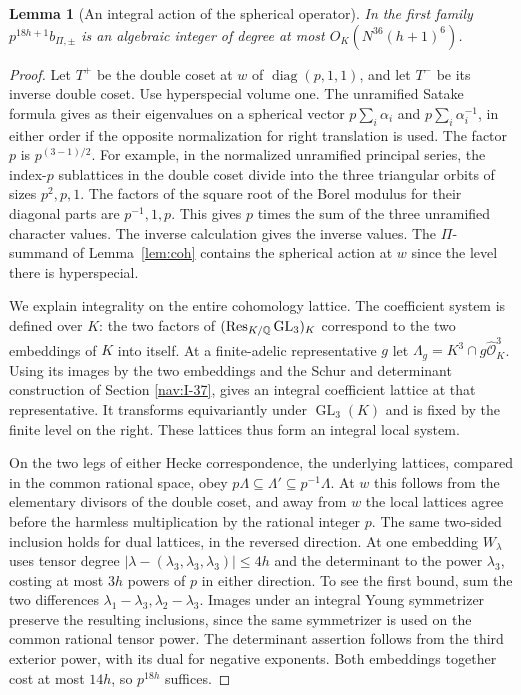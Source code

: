 \documentclass[a4paper,11pt]{article}
\newtheorem{lemma}[proposition]{Lemma}
\theoremstyle{definition}
\theoremstyle{remark}
\numberwithin{equation}{section}
\newcommand{\GL}{\operatorname{GL}}
\newcommand{\OO}{\mathcal O}
\begin{document}
\begin{lemma}[An integral action of the spherical operator]\label{lem:int}
In the first family \(p^{18h+1}b_{\Pi,\pm}\) is an algebraic integer of degree at most \(O_K(N^{36}(h+1)^6)\).
\end{lemma}
\begin{proof}
Let \(T^+\) be the double coset at \(w\) of \(\operatorname{diag}(p,1,1)\), and let \(T^-\) be its inverse double coset. Use hyperspecial volume one. The unramified Satake formula gives as their eigenvalues on a spherical vector \(p\sum_i\alpha_i\) and \(p\sum_i\alpha_i^{-1}\), in either order if the opposite normalization for right translation is used. The factor \(p\) is \(p^{(3-1)/2}\). For example, in the normalized unramified principal series, the index-\(p\) sublattices in the double coset divide into the three triangular orbits of sizes \(p^2,p,1\). The factors of the square root of the Borel modulus for their diagonal parts are \(p^{-1},1,p\). This gives \(p\) times the sum of the three unramified character values. The inverse calculation gives the inverse values. The \(\Pi\)-summand of Lemma~\ref{lem:coh} contains the spherical action at \(w\) since the level there is hyperspecial.

We explain integrality on the entire cohomology lattice. The coefficient system is defined over \(K\): the two factors of \((\operatorname{Res}_{K/\QQ}\GL_3)_K\) correspond to the two embeddings of \(K\) into itself. At a finite-adelic representative \(g\) let \(\Lambda_g=K^3\cap g\widehat{\OO}_K^3\). Using its images by the two embeddings and the Schur and determinant construction of Section \ref{nav:I-37}, gives an integral coefficient lattice at that representative. It transforms equivariantly under \(\GL_3(K)\) and is fixed by the finite level on the right. These lattices thus form an integral local system.

On the two legs of either Hecke correspondence, the underlying lattices, compared in the common rational space, obey \(p\Lambda\subseteq\Lambda'\subseteq p^{-1}\Lambda\). At \(w\) this follows from the elementary divisors of the double coset, and away from \(w\) the local lattices agree before the harmless multiplication by the rational integer \(p\). The same two-sided inclusion holds for dual lattices, in the reversed direction. At one embedding \(W_\lambda\) uses tensor degree \(|\lambda-(\lambda_3,\lambda_3,\lambda_3)|\le4h\) and the determinant to the power \(\lambda_3\), costing at most \(3h\) powers of \(p\) in either direction. To see the first bound, sum the two differences \(\lambda_1-\lambda_3,\lambda_2-\lambda_3\). Images under an integral Young symmetrizer preserve the resulting inclusions, since the same symmetrizer is used on the common rational tensor power. The determinant assertion follows from the third exterior power, with its dual for negative exponents. Both embeddings together cost at most \(14h\), so \(p^{18h}\) suffices.


\end{proof}
\end{document}
